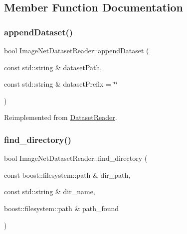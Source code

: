 \subsection{Member Function Documentation}
\mbox{\label{class_image_net_dataset_reader_ae9aa640c47637de8cf22ed3644c945c6}} 
\subsubsection{\texorpdfstring{append\+Dataset()}{appendDataset()}}
{\footnotesize\ttfamily bool Image\+Net\+Dataset\+Reader\+::append\+Dataset (\begin{DoxyParamCaption}\item[{const std\+::string \&}]{dataset\+Path,  }\item[{const std\+::string \&}]{dataset\+Prefix = {\ttfamily \char`\"{}\char`\"{}} }\end{DoxyParamCaption})\hspace{0.3cm}{\ttfamily [virtual]}}



Reimplemented from \hyperlink{class_dataset_reader_a732438244cec7c20294f93c6b635888c}{Dataset\+Reader}.

\mbox{\label{class_image_net_dataset_reader_aaad29c493db0f08ad14a426aa900a000}} 
\subsubsection{\texorpdfstring{find\+\_\+directory()}{find\_directory()}}
{\footnotesize\ttfamily bool Image\+Net\+Dataset\+Reader\+::find\+\_\+directory (\begin{DoxyParamCaption}\item[{const boost\+::filesystem\+::path \&}]{dir\+\_\+path,  }\item[{const std\+::string \&}]{dir\+\_\+name,  }\item[{boost\+::filesystem\+::path \&}]{path\+\_\+found }\end{DoxyParamCaption})}

